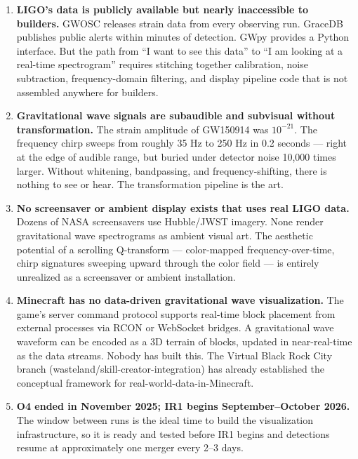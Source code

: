 \documentclass[11pt,letterpaper]{article}
\begin{document}
\begin{enumerate}
  \item \textbf{LIGO's data is publicly available but nearly inaccessible to builders.} GWOSC releases strain data from every observing run. GraceDB publishes public alerts within minutes of detection. GWpy provides a Python interface. But the path from ``I want to see this data'' to ``I am looking at a real-time spectrogram'' requires stitching together calibration, noise subtraction, frequency-domain filtering, and display pipeline code that is not assembled anywhere for builders.

  \item \textbf{Gravitational wave signals are subaudible and subvisual without transformation.} The strain amplitude of GW150914 was $10^{-21}$. The frequency chirp sweeps from roughly 35 Hz to 250 Hz in 0.2 seconds --- right at the edge of audible range, but buried under detector noise 10,000 times larger. Without whitening, bandpassing, and frequency-shifting, there is nothing to see or hear. The transformation pipeline is the art.

  \item \textbf{No screensaver or ambient display exists that uses real LIGO data.} Dozens of NASA screensavers use Hubble/JWST imagery. None render gravitational wave spectrograms as ambient visual art. The aesthetic potential of a scrolling Q-transform --- color-mapped frequency-over-time, chirp signatures sweeping upward through the color field --- is entirely unrealized as a screensaver or ambient installation.

  \item \textbf{Minecraft has no data-driven gravitational wave visualization.} The game's server command protocol supports real-time block placement from external processes via RCON or WebSocket bridges. A gravitational wave waveform can be encoded as a 3D terrain of blocks, updated in near-real-time as the data streams. Nobody has built this. The Virtual Black Rock City branch (wasteland/skill-creator-integration) has already established the conceptual framework for real-world-data-in-Minecraft.

  \item \textbf{O4 ended in November 2025; IR1 begins September--October 2026.} The window between runs is the ideal time to build the visualization infrastructure, so it is ready and tested before IR1 begins and detections resume at approximately one merger every 2--3 days.
\end{enumerate}
\end{document}
